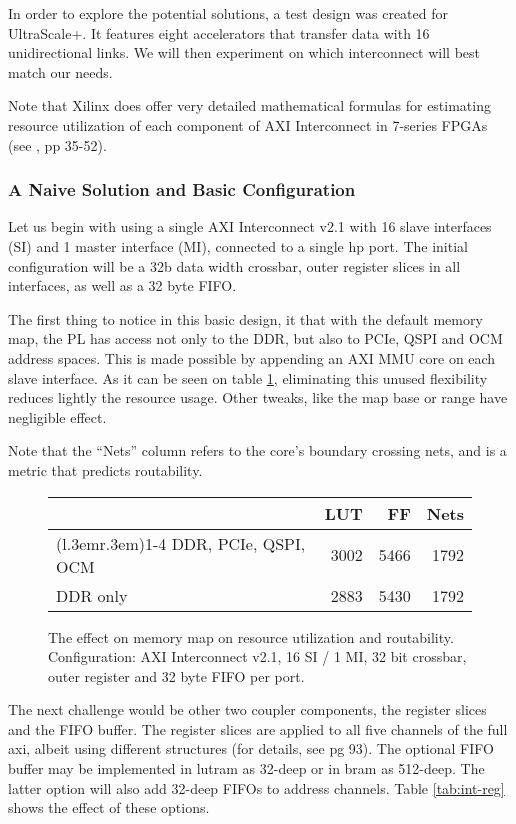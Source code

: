 In order to explore the potential solutions, a test design was created for UltraScale+. 
It features eight accelerators that transfer data with 16 unidirectional links. 
We will then experiment on which interconnect will best match our needs.

Note that Xilinx does offer very detailed mathematical formulas 
for estimating resource utilization of each component of AXI Interconnect 
in 7-series FPGAs (see \cite{pg059}, pp 35-52).

\subsubsection{A Naive Solution and Basic Configuration}

Let us begin with using a single AXI Interconnect v2.1
with 16 slave interfaces (SI) and 1 master interface (MI), 
connected to a single \gls{hp} port. The initial configuration
will be a 32b data width crossbar, outer register slices in all interfaces,
as well as a 32 byte FIFO.

The first thing to notice in this basic design,
it that with the default memory map, the PL has access not only to the DDR,
but also to PCIe, QSPI and OCM address spaces. 
This is made possible by appending an AXI MMU core on each slave interface.
As it can be seen on table \ref{tab:int-mmu}, eliminating this unused flexibility
reduces lightly the resource usage. Other tweaks, like the map base or range
have negligible effect.

Note that the ``Nets'' column refers to the core's boundary crossing nets,
and is a metric that predicts routability.

\begin{figure}[ht!]
\centering
\begin{tabular}{lrrr}
\toprule
			& LUT	& FF	& Nets \\
\cmidrule(l{.3em}r{.3em}){1-4}
DDR, PCIe, QSPI, OCM	& 3002	& 5466	& 1792\\
DDR only		& 2883	& 5430	& 1792\\
\bottomrule
\end{tabular}
\caption{The effect on memory map on resource utilization and routability.\\
	Configuration: AXI Interconnect v2.1, 16 SI / 1 MI, 32 bit crossbar, 
	outer register and 32 byte FIFO per port.}
\label{tab:int-mmu}
\end{figure}

The next challenge would be other two coupler components, the register slices
and the FIFO buffer. The register slices are applied to all five channels of the full \gls{axi},
albeit using different structures (for details, see \cite{pg059} pg 93).
The optional FIFO buffer may be implemented in \gls{lutram} as 32-deep or in \gls{bram} 
as 512-deep. The latter option will also add 32-deep FIFOs to address channels.
Table \ref{tab:int-reg} shows the effect of these options.

